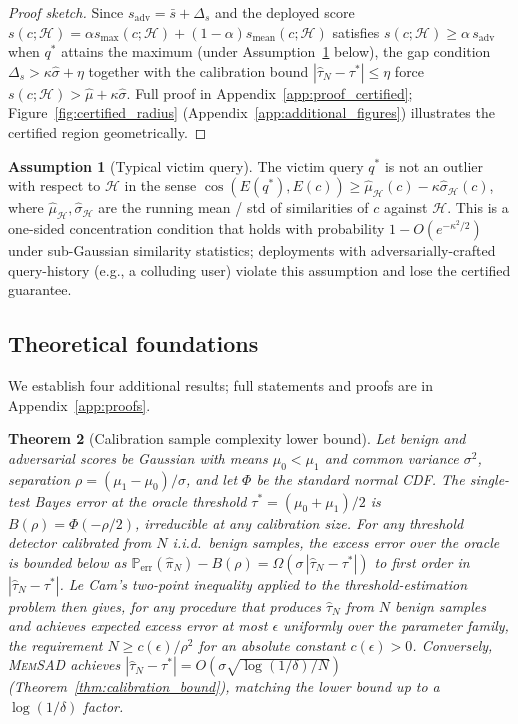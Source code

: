 \documentclass{article}
\newtheorem{theorem}{Theorem}
\theoremstyle{definition}
\newtheorem{assumption}[theorem]{Assumption}
\newcommand{\PP}{\mathbb{P}}
\newcommand{\cH}{\mathcal{H}}
\newcommand{\memsad}{\textnormal{\textsc{MemSAD}}}
\newcommand{\enc}{E}
\DeclareMathOperator{\cosim}{cos}
\begin{document}
\begin{proof}[Proof sketch]
Since $s_{\text{adv}} = \bar{s} + \Delta_s$ and the deployed score $s(c;\cH) = \alpha s_{\max}(c;\cH) + (1-\alpha)s_{\text{mean}}(c;\cH)$ satisfies $s(c;\cH) \geq \alpha\, s_{\text{adv}}$ when $q^*$ attains the maximum (under Assumption~\ref{ass:typical_query} below), the gap condition $\Delta_s > \kappa\hat\sigma + \eta$ together with the calibration bound $|\hat\tau_N - \tau^*| \leq \eta$ force $s(c;\cH) > \hat\mu + \kappa\hat\sigma$. Full proof in Appendix~\ref{app:proof_certified}; Figure~\ref{fig:certified_radius} (Appendix~\ref{app:additional_figures}) illustrates the certified region geometrically.
\end{proof}

\begin{assumption}[Typical victim query]
\label{ass:typical_query}
The victim query $q^*$ is not an outlier with respect to $\cH$ in the sense $\cosim(\enc(q^*), \enc(c)) \geq \hat\mu_{\cH}(c) - \kappa\hat\sigma_{\cH}(c)$, where $\hat\mu_{\cH}, \hat\sigma_{\cH}$ are the running mean / std of similarities of $c$ against $\cH$. This is a one-sided concentration condition that holds with probability $1 - O(e^{-\kappa^2/2})$ under sub-Gaussian similarity statistics; deployments with adversarially-crafted query-history (e.g., a colluding user) violate this assumption and lose the certified guarantee.
\end{assumption}

\subsection{Theoretical foundations}
\label{sec:lower_bound}

We establish four additional results; full statements and proofs are in Appendix~\ref{app:proofs}.

\begin{theorem}[Calibration sample complexity lower bound]
\label{thm:minimax_lower}
Let benign and adversarial scores be Gaussian with means $\mu_0 < \mu_1$ and common variance $\sigma^2$, separation $\rho = (\mu_1-\mu_0)/\sigma$, and let $\Phi$ be the standard normal CDF. The single-test Bayes error at the oracle threshold $\tau^* = (\mu_0+\mu_1)/2$ is $B(\rho) = \Phi(-\rho/2)$, irreducible at any calibration size. For any threshold detector calibrated from $N$ i.i.d.\ benign samples, the excess error over the oracle is bounded below as $\PP_{\text{err}}(\hat\pi_N) - B(\rho) = \Omega(\sigma\,|\hat\tau_N - \tau^*|)$ to first order in $|\hat\tau_N - \tau^*|$. Le Cam's two-point inequality applied to the threshold-estimation problem then gives, for any procedure that produces $\hat\tau_N$ from $N$ benign samples and achieves expected excess error at most $\epsilon$ uniformly over the parameter family, the requirement $N \geq c(\epsilon)/\rho^2$ for an absolute constant $c(\epsilon) > 0$. Conversely, \memsad{} achieves $|\hat\tau_N - \tau^*| = O(\sigma\sqrt{\log(1/\delta)/N})$ (Theorem~\ref{thm:calibration_bound}), matching the lower bound up to a $\log(1/\delta)$ factor.
\end{theorem}
\end{document}
